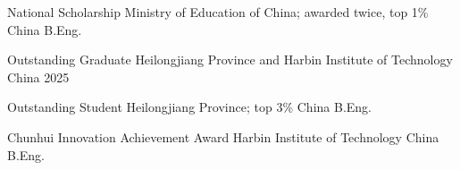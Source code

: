 
\begin{cvhonors}
  \cvhonor
    {National Scholarship}
    {Ministry of Education of China; awarded twice, top 1\%}
    {China}
    {B.Eng.}

  \cvhonor
    {Outstanding Graduate}
    {Heilongjiang Province and Harbin Institute of Technology}
    {China}
    {2025}

  \cvhonor
    {Outstanding Student}
    {Heilongjiang Province; top 3\%}
    {China}
    {B.Eng.}

  \cvhonor
    {Chunhui Innovation Achievement Award}
    {Harbin Institute of Technology}
    {China}
    {B.Eng.}
\end{cvhonors}
